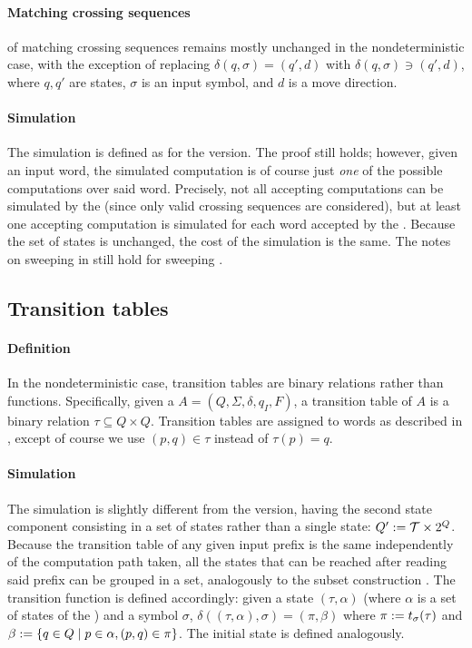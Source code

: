 \paragraph{Matching crossing sequences}  of matching crossing sequences remains mostly unchanged in the nondeterministic case, with the exception of replacing $\delta(q,\sigma)=(q',d)$ with $\delta(q,\sigma)\ni(q',d)$, where $q,q'$ are states, $\sigma$ is an input symbol, and $d$ is a move direction.

\paragraph{Simulation} The simulation is defined as for the \TDFA version.
The proof still holds; however, given an input word, the simulated computation is of course just \emph{one} of the possible computations over said word.
Precisely, not all accepting computations can be simulated by the \ONFA (since only valid crossing sequences are considered), but at least one accepting computation is simulated for each word accepted by the \TNFA.
Because the set of states is unchanged, the cost of the simulation is the same.
The notes on sweeping \TDFAs in  still hold for sweeping \TNFAs.


\subsection{Transition tables}

\paragraph{Definition} In the nondeterministic case, transition tables are binary relations rather than functions.
Specifically, given a \TNFA $A=(Q,\Sigma,\delta,q_I,F)$, a transition table of $A$ is a binary relation $\tau\subseteq Q\times Q$.
Transition tables are assigned to words as described in , except of course we use $(p,q)\in\tau$ instead of $\tau(p)=q$.

\paragraph{Simulation} The simulation is slightly different from the \TDFA version, having the second state component consisting in a set of states rather than a single state: $Q':=\mathcal T\times2^{Q}$.
Because the transition table of any given input prefix is the same independently of the computation path taken, all the states that can be reached after reading said prefix can be grouped in a set, analogously to the subset construction \cite{RabSco59,HopUll79}.
The transition function is defined accordingly: given a state $(\tau,\alpha)$ (where $\alpha$ is a set of states of the \TNFA) and a symbol $\sigma$, $\delta((\tau,\alpha),\sigma)=(\pi,\beta)$ where $\pi:=t_\sigma(\tau)$ and $\beta:=\{q\in Q\mid p\in\alpha, (p,q)\in\pi\}$.
The initial state is defined analogously.

